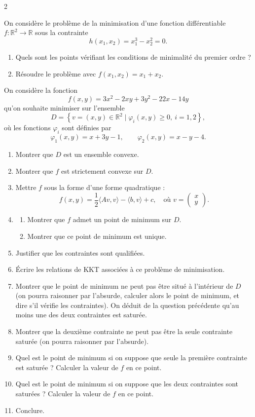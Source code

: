 \begin{multicols}{2}
\begin{exercice}
	On considère le problème de la minimisation d’une fonction différentiable \( f : \mathbb{R}^2 \rightarrow \mathbb{R} \) sous la contrainte
	\[
	h(x_1, x_2) = x_1^3 - x_2^2 = 0.
	\]
	\begin{enumerate}[label=\arabic*.,leftmargin=*]
		\item Quels sont les points vérifiant les conditions de minimalité du premier ordre ?
		\item Résoudre le problème avec \( f(x_1, x_2) = x_1 + x_2 \).
	\end{enumerate}
\end{exercice}

\begin{exercice}
	On considère la fonction
	\[
	f(x,y) = 3x^2 - 2xy + 3y^2 - 22x - 14y
	\]
	qu'on souhaite minimiser sur l'ensemble
	\[
	D = \left\{ v = (x,y) \in \mathbb{R}^2 \mid \varphi_i(x,y) \geq 0,\ i=1,2 \right\},
	\]
	où les fonctions $\varphi_i$ sont définies par
	\[
	\varphi_1(x,y) = x + 3y - 1, \qquad \varphi_2(x,y) = x - y - 4.
	\]
	\begin{enumerate}[label=\arabic*.]
		\item Montrer que $D$ est un ensemble convexe.
		\item Montrer que $f$ est strictement convexe sur $D$.
		\item Mettre $f$ sous la forme d'une forme quadratique :
		\[
		f(x,y) = \frac{1}{2} \langle A v, v \rangle - \langle b, v \rangle + c,
		\quad \text{où } v = \begin{pmatrix} x \\ y \end{pmatrix}.
		\]
		\item
		\begin{enumerate}
			\item Montrer que $f$ admet un point de minimum sur $D$.
			\item Montrer que ce point de minimum est unique.
		\end{enumerate}
		\item Justifier que les contraintes sont qualifiées.
		\item Écrire les relations de KKT associées à ce problème de minimisation.
		\item Montrer que le point de minimum ne peut pas être situé à l'intérieur de $D$ (on pourra raisonner par l'absurde, calculer alors le point de minimum, et dire s'il vérifie les contraintes).
		On déduit de la question précédente qu'au moins une des deux contraintes est saturée.
		\item Montrer que la deuxième contrainte ne peut pas être la seule contrainte saturée (on pourra raisonner par l'absurde).
		\item Quel est le point de minimum si on suppose que seule la première contrainte est saturée ? Calculer la valeur de $f$ en ce point.
		\item Quel est le point de minimum si on suppose que les deux contraintes sont saturées ? Calculer la valeur de $f$ en ce point.
		\item Conclure.
	\end{enumerate}
\end{exercice}


\end{multicols}
